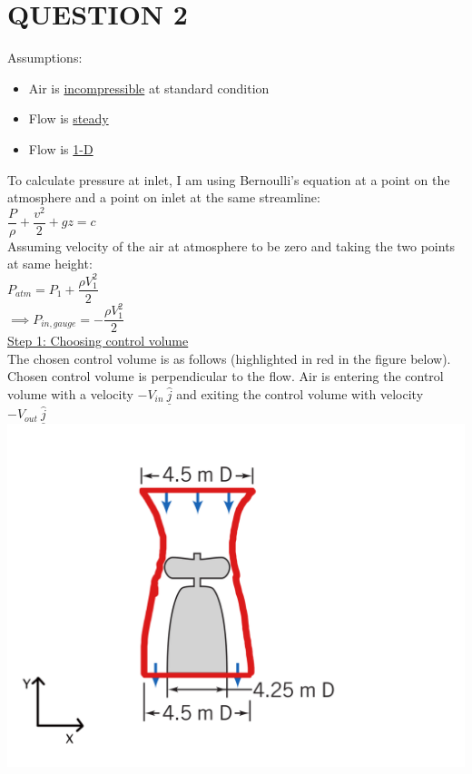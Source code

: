\documentclass{article}
\begin{document}
\newpage
\section{\Large QUESTION 2}

Assumptions: 
\begin{itemize}
    \item Air is \underline{incompressible} at standard condition
    \item Flow is \underline{steady}
    \item Flow is \underline{1-D}
\end{itemize}
\bigbreak

\noindent To calculate pressure at inlet, I am using Bernoulli's equation at a point on the atmosphere and a point on inlet at the same streamline:\\
$\dfrac{P}{\rho}+\dfrac{v^2}{2}+gz=c$\\
Assuming velocity of the air at atmosphere to be zero and taking the two points at same height:\\
$P_{atm}=P_1+\dfrac{\rho V_1^2}{2}$\\
$\implies P_{in,gauge}=-\dfrac{\rho V_1^2}{2}$\\


\noindent \underline{Step 1: Choosing control volume}\\

\noindent The chosen control volume is as follows (highlighted in red in the figure below). Chosen control volume is perpendicular to the flow. Air is entering the control volume with a velocity $-V_{in} \ \hat{\underline{j}}$ and exiting the control volume with velocity $-V_{out} \ \hat{\underline{j}}$ \\
\includegraphics[scale=0.6]{225q2.png}
\end{document}
